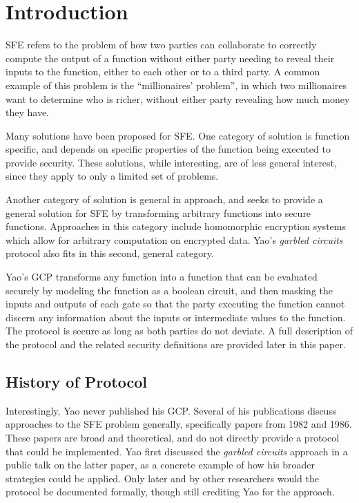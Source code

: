 \section{Introduction}
\label{sec:intro}

\ac{SFE} refers to the problem of how two parties can collaborate to correctly compute the output of a function without either party needing to reveal their inputs to the function, either to each other or to a third party.  A common example of this problem is the ``millionaires' problem'', in which two millionaires want to determine who is richer, without either party revealing how much money they have\cite{yao1982protocols}.

Many solutions have been proposed for \ac{SFE}. One category of solution is function specific, and depends on specific properties of the function being executed to provide security\cite{huang2011faster}.  These solutions, while interesting, are of less general interest, since they apply to only a limited set of problems.

Another category of solution is general in approach, and seeks to provide a general solution for \ac{SFE} by transforming arbitrary functions into secure functions. Approaches in this category include homomorphic encryption systems\cite{gentry2009fully} which allow for arbitrary computation on encrypted data.  Yao's \emph{garbled circuits} protocol also fits in this second, general category.

Yao's \ac{GCP} transforms any function into a function that can be evaluated securely by modeling the function as a boolean circuit, and then masking the inputs and outputs of each gate so that the party executing the function cannot discern any information about the inputs or intermediate values to the function. The protocol is secure as long as both parties do not deviate. A full description of the protocol and the related security definitions are provided later in this paper.

\subsection{History of Protocol}

Interestingly, Yao never published his \ac{GCP}. Several of his publications discuss approaches to the \ac{SFE} problem generally, specifically papers from 1982\cite{yao1982protocols} and 1986\cite{yao1986generate}. These papers are broad and theoretical, and do not directly provide a protocol that could be implemented. Yao first discussed the \emph{garbled circuits} approach in a public talk on the latter paper, as a concrete example of how his broader strategies could be applied\cite{bellare2012foundations}. Only later and by other researchers would the protocol be documented formally\cite{goldreich1987play}, though still crediting Yao for the approach.

